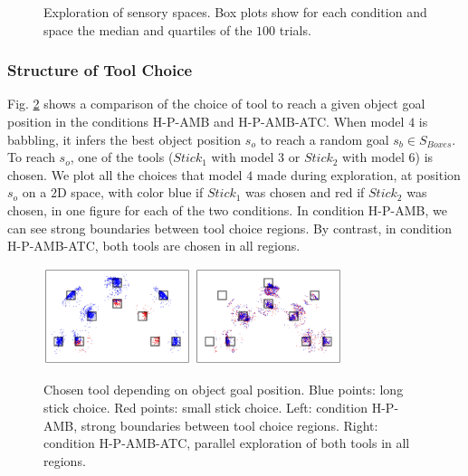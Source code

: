 \documentclass[10pt,letterpaper]{article}
\begin{document}
\begin{figure}[ht]
			\caption{Exploration of sensory spaces. Box plots show for each condition and space the median and quartiles of the $100$ trials.}
			\label{res_explo}
		\end{figure}

	
	\subsubsection{Structure of Tool Choice}

		Fig. \ref{res_choice} shows a comparison of the choice of tool to reach a given object goal position in the conditions H-P-AMB and H-P-AMB-ATC.
		When model $4$ is babbling, it infers the best object position $s_o$ to reach a random goal $s_b \in S_{Boxes}$.
		To reach $s_o$, one of the tools ($Stick_1$ with model $3$ or $Stick_2$ with model $6$) is chosen. 
		We plot all the choices that model $4$ made during exploration, at position $s_o$ on a $2$D space, with color blue if $Stick_1$ was chosen and red if $Stick_2$ was chosen, 
		in one figure for each of the two conditions.
		In condition H-P-AMB, we can see strong boundaries between tool choice regions.
		By contrast, in condition H-P-AMB-ATC, both tools are chosen in all regions.

		
		\begin{figure}[ht]
			\centering
			\includegraphics[width=4.3cm]{./include/choice-H-RGB-P-AMB.pdf}
			\hspace{-0.2cm}
			\includegraphics[width=4.3cm]{./include/choice-H-RGB-P-AMB-PGITC.pdf}
			\caption{Chosen tool depending on object goal position. Blue points: long stick choice. Red points: small stick choice. Left: condition H-P-AMB, strong boundaries 
			between tool choice regions. Right: condition H-P-AMB-ATC, parallel exploration of both tools in all regions.}
			\label{res_choice}
		\end{figure}
		
\end{document}
